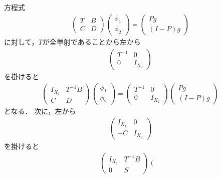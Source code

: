 \begin{Proof}
方程式
\begin{align*}
	\left( \begin{array}{cc}
		T & B \\
		C & D
	\end{array} \right)\left( \begin{array}{c}
		\phi_1 \\
		\phi_2
	\end{array} \right) = \left( \begin{array}{c}
		Pg \\
		(I-P)g
	\end{array} \right)
\end{align*}
に対して，$T$が全単射であることから左から
\begin{align*}
	 \left( \begin{array}{cc}
		T^{-1} & 0  \\
		0 & I_{X_2}
	\end{array} \right)
\end{align*}
を掛けると	
\begin{align*}
	\left( \begin{array}{cc}
		I_{X_1} & T^{-1} B \\
		C & D
	\end{array} \right) \left( \begin{array}{c}
		\phi_1 \\
		\phi_2
	\end{array} \right) = \left( \begin{array}{cc}
		T^{-1} & 0  \\
		0 & I_{X_2}
	\end{array} \right) \left( \begin{array}{c}
		Pg \\
		(I-P)g
	\end{array} \right)
\end{align*}
となる．
次に，左から
\begin{align*}
	 \left( \begin{array}{cc}
		 I_{X_1} & 0  \\
		 -C & I_{X_2}
	\end{array} \right)
\end{align*}
を掛けると
\begin{align*}
	\left( \begin{array}{cc}
		I_{X_1} & T^{-1} B \\
		0 & S
	\end{array} \right) \left( \begin{array}{c}

\end{array}
\end{align*}
\end{Proof}
